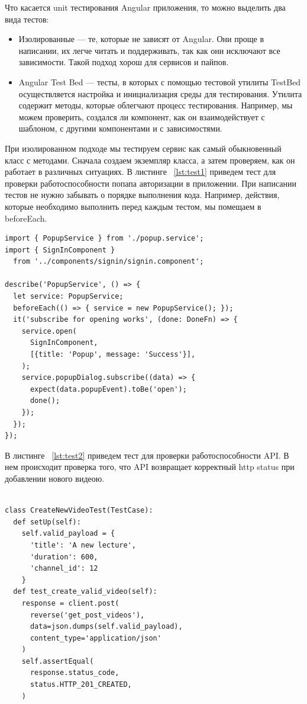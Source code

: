 Что касается unit тестирования Angular приложения, то можно выделить два вида тестов:

\begin{itemize}[wide,topsep=0pt]
  \itemsep0em
  \item Изолированные — те, которые не зависят от Angular. Они проще в написании,
    их легче читать и поддерживать, так как они исключают все зависимости.
    Такой подход хорош для сервисов и пайпов.
  \item Angular Test Bed — тесты, в которых с помощью тестовой утилиты TestBed
    осуществляется настройка и инициализация среды для тестирования. Утилита
    содержит методы, которые облегчают процесс тестирования. Например, мы можем проверить,
    создался ли компонент, как он взаимодействует с шаблоном, с другими компонентами и
    с зависимостями.
\end{itemize}

При изолированном подходе мы тестируем сервис как самый обыкновенный класс с методами.
Сначала создаем экземпляр класса, а затем проверяем, как он работает в различных ситуациях.
В листинге ~\ref{lst:test1} приведем тест для проверки работоспособности попапа авторизации
в приложении. При написании тестов не нужно забывать о порядке выполнения кода.
Например, действия, которые необходимо выполнить перед каждым тестом,
мы помещаем в beforeEach.

\begin{lstlisting}[caption={Тестирование попапа авторизации}, label=lst:test1]
import { PopupService } from './popup.service';
import { SignInComponent }
  from '../components/signin/signin.component';

describe('PopupService', () => {
  let service: PopupService;
  beforeEach(() => { service = new PopupService(); });
  it('subscribe for opening works', (done: DoneFn) => {
    service.open(
      SignInComponent,
      [{title: 'Popup', message: 'Success'}],
    );
    service.popupDialog.subscribe((data) => {
      expect(data.popupEvent).toBe('open');
      done();
    });
  });
});
\end{lstlisting}

В листинге ~\ref{lst:test2} приведем тест для проверки работоспособности API. В нем происходит
проверка того, что API возвращает корректный http status при добавлении нового видеою.

\begin{lstlisting}[caption={Тест на добавление нового видео}, label=lst:test2]

class CreateNewVideoTest(TestCase):
  def setUp(self):
    self.valid_payload = {
      'title': 'A new lecture',
      'duration': 600,
      'channel_id': 12
    }
  def test_create_valid_video(self):
    response = client.post(
      reverse('get_post_videos'),
      data=json.dumps(self.valid_payload),
      content_type='application/json'
    )
    self.assertEqual(
      response.status_code,
      status.HTTP_201_CREATED,
    )
\end{lstlisting}

